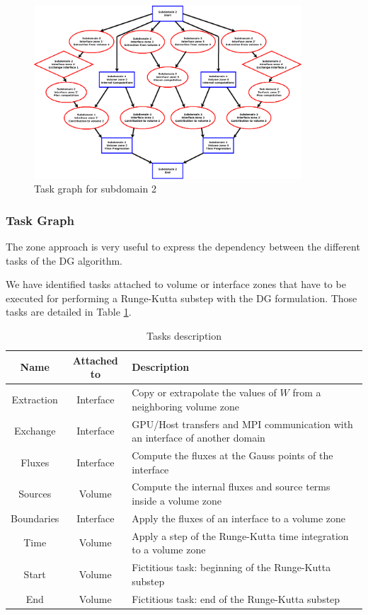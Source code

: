 \documentclass{svmult}
\begin{document}
\begin{figure}
  \centering
  \includegraphics[width=10cm]{graph_exemple_2}
  \caption{Task graph for subdomain 2}
  \label{fig:sub2-task-graph}
\end{figure}


\subsubsection{Task Graph}
The zone approach is very useful to express the dependency between the
different tasks of the DG algorithm.

We have identified tasks attached to volume or interface zones that
have to be executed for performing a Runge-Kutta substep with the DG
formulation. Those tasks are detailed in Table \ref{tab:tasks}.

\begin{table}[h]
  \centering
  \caption{Tasks description}
  \label{tab:tasks}
  \begin{tabular}{|c|c|m{4cm}|}
    \hline
    Name & Attached to & Description\tabularnewline
    \hline
    \hline
    Extraction & Interface & Copy or extrapolate the values of $W$ from a neighboring volume
    zone \tabularnewline
    \hline
    Exchange & Interface & GPU/Host transfers and MPI communication with an interface of another domain\tabularnewline
    \hline
    Fluxes & Interface & Compute the fluxes at the Gauss points of the interface\tabularnewline
    \hline
    Sources & Volume & Compute the internal fluxes and source terms inside a volume zone\tabularnewline
    \hline
    Boundaries & Interface & Apply the fluxes of an interface to a volume zone\tabularnewline
    \hline
    Time & Volume & Apply a step of the Runge-Kutta time integration to a volume zone\tabularnewline
    \hline
    Start & Volume & Fictitious task: beginning of the Runge-Kutta substep\tabularnewline
    \hline
    End & Volume & Fictitious task: end of the Runge-Kutta substep\tabularnewline
    \hline
  \end{tabular}
\end{table}
\end{document}
